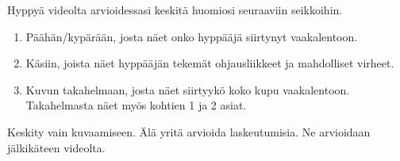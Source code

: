 Hyppyä videolta arvioidessasi keskitä huomiosi seuraaviin seikkoihin. 

\begin{enumerate}[label=\bfseries \arabic*)]
\item  Päähän/kypärään, josta näet onko hyppääjä siirtynyt vaakalentoon. 
\item  Käsiin, joista näet hyppääjän tekemät ohjausliikkeet ja mahdolliset virheet. 
\item  Kuvun takahelmaan, josta näet siirtyykö koko kupu vaakalentoon. Takahelmasta näet myös kohtien 1 ja 2 asiat. 
\end{enumerate}

Keskity vain kuvaamiseen. Älä yritä arvioida laskeutumisia. Ne arvioidaan jälkikäteen videolta. 

